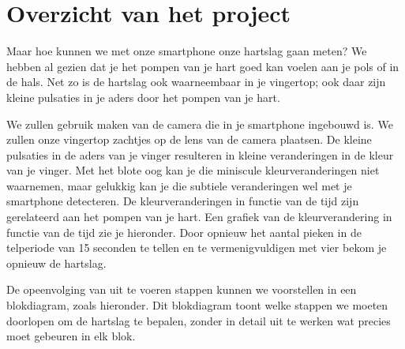 \section{Overzicht van het project}
\label{sec:Mod1_Sec3}

Maar hoe kunnen we met onze smartphone onze hartslag gaan meten? We hebben al gezien dat je het pompen van je hart goed kan voelen aan je pols of in de hals. Net zo is de hartslag ook waarneembaar in je vingertop; ook daar zijn kleine pulsaties in je aders door het pompen van je hart. 


We zullen gebruik maken van de camera die in je smartphone ingebouwd is. We zullen onze vingertop zachtjes op de lens van de camera plaatsen. De kleine pulsaties in de aders van je vinger resulteren in kleine veranderingen in de kleur van je vinger. Met het blote oog kan je die miniscule kleurveranderingen niet waarnemen, maar gelukkig kan je die subtiele veranderingen wel met je smartphone detecteren. De kleurveranderingen in functie van de tijd zijn gerelateerd aan het pompen van je hart. Een grafiek van de kleurverandering in functie van de tijd zie je hieronder. Door opnieuw het aantal pieken in de telperiode van 15 seconden te tellen en te vermenigvuldigen met vier bekom je opnieuw de hartslag.


De opeenvolging van uit te voeren stappen kunnen we voorstellen in een blokdiagram, zoals hieronder. Dit blokdiagram toont welke stappen we moeten doorlopen om de hartslag te bepalen, zonder in detail uit te werken wat precies moet gebeuren in elk blok.



